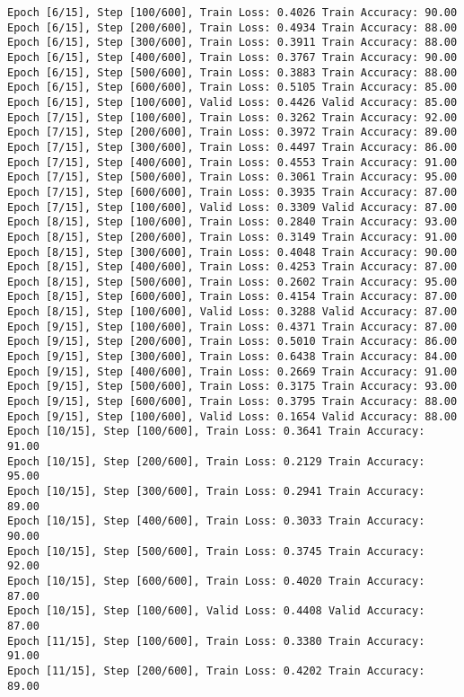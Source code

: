 \documentclass[11pt]{article}
\begin{document}
\begin{Verbatim}[commandchars=\\\{\}]
Epoch [6/15], Step [100/600], Train Loss: 0.4026 Train Accuracy: 90.00
Epoch [6/15], Step [200/600], Train Loss: 0.4934 Train Accuracy: 88.00
Epoch [6/15], Step [300/600], Train Loss: 0.3911 Train Accuracy: 88.00
Epoch [6/15], Step [400/600], Train Loss: 0.3767 Train Accuracy: 90.00
Epoch [6/15], Step [500/600], Train Loss: 0.3883 Train Accuracy: 88.00
Epoch [6/15], Step [600/600], Train Loss: 0.5105 Train Accuracy: 85.00
Epoch [6/15], Step [100/600], Valid Loss: 0.4426 Valid Accuracy: 85.00
Epoch [7/15], Step [100/600], Train Loss: 0.3262 Train Accuracy: 92.00
Epoch [7/15], Step [200/600], Train Loss: 0.3972 Train Accuracy: 89.00
Epoch [7/15], Step [300/600], Train Loss: 0.4497 Train Accuracy: 86.00
Epoch [7/15], Step [400/600], Train Loss: 0.4553 Train Accuracy: 91.00
Epoch [7/15], Step [500/600], Train Loss: 0.3061 Train Accuracy: 95.00
Epoch [7/15], Step [600/600], Train Loss: 0.3935 Train Accuracy: 87.00
Epoch [7/15], Step [100/600], Valid Loss: 0.3309 Valid Accuracy: 87.00
Epoch [8/15], Step [100/600], Train Loss: 0.2840 Train Accuracy: 93.00
Epoch [8/15], Step [200/600], Train Loss: 0.3149 Train Accuracy: 91.00
Epoch [8/15], Step [300/600], Train Loss: 0.4048 Train Accuracy: 90.00
Epoch [8/15], Step [400/600], Train Loss: 0.4253 Train Accuracy: 87.00
Epoch [8/15], Step [500/600], Train Loss: 0.2602 Train Accuracy: 95.00
Epoch [8/15], Step [600/600], Train Loss: 0.4154 Train Accuracy: 87.00
Epoch [8/15], Step [100/600], Valid Loss: 0.3288 Valid Accuracy: 87.00
Epoch [9/15], Step [100/600], Train Loss: 0.4371 Train Accuracy: 87.00
Epoch [9/15], Step [200/600], Train Loss: 0.5010 Train Accuracy: 86.00
Epoch [9/15], Step [300/600], Train Loss: 0.6438 Train Accuracy: 84.00
Epoch [9/15], Step [400/600], Train Loss: 0.2669 Train Accuracy: 91.00
Epoch [9/15], Step [500/600], Train Loss: 0.3175 Train Accuracy: 93.00
Epoch [9/15], Step [600/600], Train Loss: 0.3795 Train Accuracy: 88.00
Epoch [9/15], Step [100/600], Valid Loss: 0.1654 Valid Accuracy: 88.00
Epoch [10/15], Step [100/600], Train Loss: 0.3641 Train Accuracy: 91.00
Epoch [10/15], Step [200/600], Train Loss: 0.2129 Train Accuracy: 95.00
Epoch [10/15], Step [300/600], Train Loss: 0.2941 Train Accuracy: 89.00
Epoch [10/15], Step [400/600], Train Loss: 0.3033 Train Accuracy: 90.00
Epoch [10/15], Step [500/600], Train Loss: 0.3745 Train Accuracy: 92.00
Epoch [10/15], Step [600/600], Train Loss: 0.4020 Train Accuracy: 87.00
Epoch [10/15], Step [100/600], Valid Loss: 0.4408 Valid Accuracy: 87.00
Epoch [11/15], Step [100/600], Train Loss: 0.3380 Train Accuracy: 91.00
Epoch [11/15], Step [200/600], Train Loss: 0.4202 Train Accuracy: 89.00

\end{Verbatim}
\end{document}
